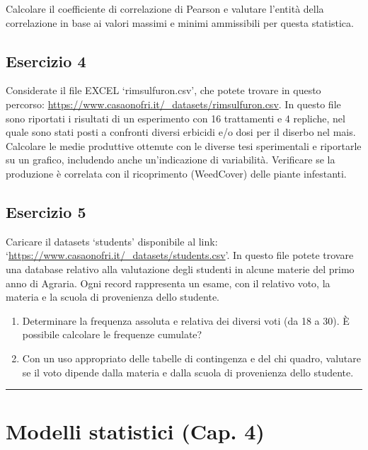 \documentclass[a4paper,12pt,oneside]{book}
\providecommand{\tightlist}{%
  \setlength{\itemsep}{0pt}\setlength{\parskip}{0pt}}
\begin{document}
Calcolare il coefficiente di correlazione di Pearson e valutare l'entità della correlazione in base ai valori massimi e minimi ammissibili per questa statistica.

\hypertarget{esercizio-4-1}{%
\subsection{Esercizio 4}\label{esercizio-4-1}}

Considerate il file EXCEL `rimsulfuron.csv', che potete trovare in questo percorso: \url{https://www.casaonofri.it/_datasets/rimsulfuron.csv}. In questo file sono riportati i risultati di un esperimento con 16 trattamenti e 4 repliche, nel quale sono stati posti a confronti diversi erbicidi e/o dosi per il diserbo nel mais. Calcolare le medie produttive ottenute con le diverse tesi sperimentali e riportarle su un grafico, includendo anche un'indicazione di variabilità. Verificare se la produzione è correlata con il ricoprimento (WeedCover) delle piante infestanti.

\hypertarget{esercizio-5-1}{%
\subsection{Esercizio 5}\label{esercizio-5-1}}

Caricare il datasets `students' disponibile al link: `\url{https://www.casaonofri.it/_datasets/students.csv}'. In questo file potete trovare una database relativo alla valutazione degli studenti in alcune materie del primo anno di Agraria. Ogni record rappresenta un esame, con il relativo voto, la materia e la scuola di provenienza dello studente.

\begin{enumerate}
\def\labelenumi{\arabic{enumi}.}
\tightlist
\item
  Determinare la frequenza assoluta e relativa dei diversi voti (da 18 a 30). È possibile calcolare le frequenze cumulate?
\item
  Con un uso appropriato delle tabelle di contingenza e del chi quadro, valutare se il voto dipende dalla materia e dalla scuola di provenienza dello studente.
\end{enumerate}

\begin{center}\rule{0.5\linewidth}{0.5pt}\end{center}

\hypertarget{modelli-statistici-cap.-4}{%
\section{Modelli statistici (Cap. 4)}\label{modelli-statistici-cap.-4}}
\end{document}
